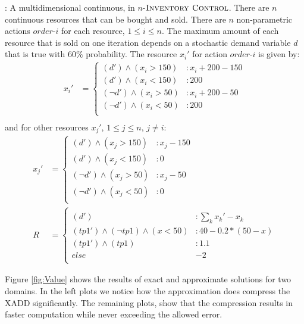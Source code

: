 \Invent:
A multidimensional continuous, in $n$-$\textsc{Inventory Control}$. There are $n$ continuous resources that can be bought and sold. There are $n$ non-parametric actions $order$-$i$ for each resource, $ 1 \leq i \leq n$. The maximum amount of  each resource that is sold on one iteration depends on a stochastic demand variable $d$ that is true with $60\%$ probability. The resource $x_i'$ for action $order$-$i$ is given by:
{\footnotesize
\begin{align*}
x_i' & = \begin{cases} 
(d') \wedge (x_i > 150) &: x_i + 200 - 150\\
(d') \wedge (x_i < 150) &:  200\\
(\neg d') \wedge (x_i > 50) &: x_i + 200 - 50\\
(\neg d') \wedge (x_i < 50) &:  200\\
\end{cases} \\
\end{align*} }
and for other resources $x_j'$, $1 \leq j \leq n$, $j\neq i$:\\
{\footnotesize
\begin{align*}
x_j' & = \begin{cases} 
(d') \wedge (x_j > 150) &: x_j - 150\\
(d') \wedge (x_j < 150) &:  0\\
(\neg d') \wedge (x_j > 50) &: x_j - 50\\
(\neg d') \wedge (x_j < 50) &:  0\\
\end{cases} \\
R & = \begin{cases} \\
(d') &: \sum_{k} {x_k' - x_k}\\
(tp1') \wedge (\neg tp1) \wedge (x < 50) &: 40 - 0.2*(50-x)\\
(tp1') \wedge ( tp1) &:  1.1\\
else & -2\\
\end{cases} 
\end{align*} }


Figure \ref{fig:Value} shows the results of exact and approximate solutions for two domains. In the left plots we notice how the approximation does compress the XADD significantly. The remaining plots, show that the compression results in faster computation while never exceeding the allowed error.
